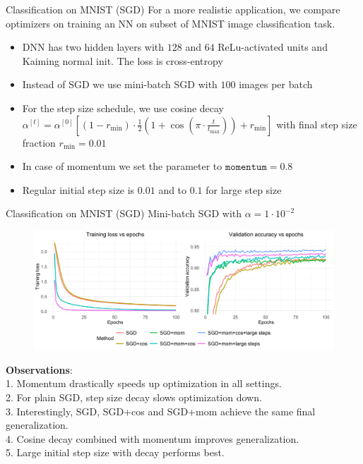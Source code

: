 \documentclass[11pt,compress,t,notes=noshow, xcolor=table]{beamer}
\begin{document}
\begin{vbframe}{Classification on MNIST (SGD)}
For a more realistic application, we compare optimizers on training an NN on subset of MNIST image classification task. 
\medskip
\begin{itemize}
     \setlength{\itemsep}{1.2em} 
    \item DNN has two hidden layers with $128$ and $64$ ReLu-activated units and Kaiming normal init. The loss is cross-entropy
    \item Instead of SGD we use mini-batch SGD with $100$ images per batch
    \item For the step size schedule, we use cosine decay $\alpha^{[t]} = \alpha^{[0]} \left[(1-r_{\text{min}}) \cdot \frac{1}{2}\left(1 + \cos\left(\pi \cdot \frac{t}{t_{\text{max}}}\right)\right) + r_{\text{min}}\right]$ with final step size fraction $r_{\text{min}}=0.01$
    \item In case of momentum we set the parameter to $\texttt{momentum}=0.8$
    \item Regular initial step size is $0.01$ and to $0.1$ for large step size
\end{itemize}
\end{vbframe}

\begin{vbframe}{Classification on MNIST (SGD)}
\vspace{-0.4cm}
Mini-batch SGD with $\alpha=1\cdot10^{-2}$
\begin{figure}
            \includegraphics[width=1.0\textwidth]{slides/04-multivariate-first-order/figure_man/simu_mnist/SGD_compar.pdf} \\
\end{figure}
{\footnotesize
\textbf{Observations}:\\ 1. Momentum drastically speeds up optimization in all settings.\\
2. For plain SGD, step size decay slows optimization down. \\
3. Interestingly, SGD, SGD+cos and SGD+mom achieve the same final generalization. \\
4. Cosine decay combined with momentum improves generalization. \\
5. Large initial step size with decay performs best.}
\end{vbframe}
\end{document}
